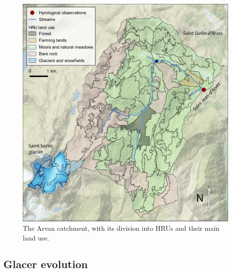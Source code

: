 \begin{figure}[h]
\centering
\includegraphics[width=12cm]{Figures/hydro/Figure_2.pdf}
\caption{The Arvan catchment, with its division into HRUs and their main land use. } 
\label{hydro:fig2}
\end{figure}

\subsection{Glacer evolution}

